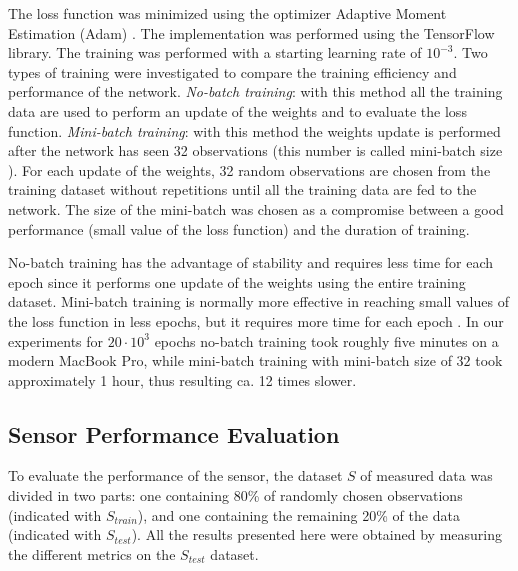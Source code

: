\documentclass[sensors,article,submit,moreauthors,pdftex,10pt,a4paper]{Definitions/mdpi}
\begin{document}
The loss function was minimized using the optimizer Adaptive Moment Estimation (Adam) \cite{Kingma2014, Michelucci2017}. The implementation was performed using the TensorFlow\texttrademark $\ $library. The training was performed with a starting learning rate of $10^{-3}$. Two types of training were investigated to compare the training efficiency and performance of the network. {\sl No-batch training}: with this method all the training data  are used to perform an update of the weights and to evaluate the loss function. {\sl Mini-batch training}: with this method the weights update is performed after the network has seen 32 observations (this number is called mini-batch size \cite{Michelucci2017}). For each update of the weights, 32 random observations are chosen from the training dataset without repetitions until all the training data are fed to the network. 
The size of the mini-batch was chosen as a compromise between a good performance (small value of the loss function) and the duration of training.

No-batch training has the advantage of stability and requires less time for each epoch since it performs one update of the weights using the entire training dataset. Mini-batch training is normally more effective in reaching small values of the loss function in less epochs, but it requires more time for each epoch \cite{Michelucci2017}. In our experiments for $20 \cdot 10^3$ epochs no-batch training took roughly five minutes on a modern MacBook Pro, while mini-batch training with  mini-batch size of $32$ took approximately 1 hour, thus resulting ca. 12 times slower. 


\subsection{Sensor Performance Evaluation}

To evaluate the performance of the sensor, the dataset $S$ of measured data was divided in two parts: one containing 80\% of randomly chosen observations (indicated with $S_{train}$), and one containing the remaining 20\% of the data (indicated with $S_{test}$). All the results presented here were obtained by measuring the different metrics on the $S_{test}$ dataset.


\end{document}
